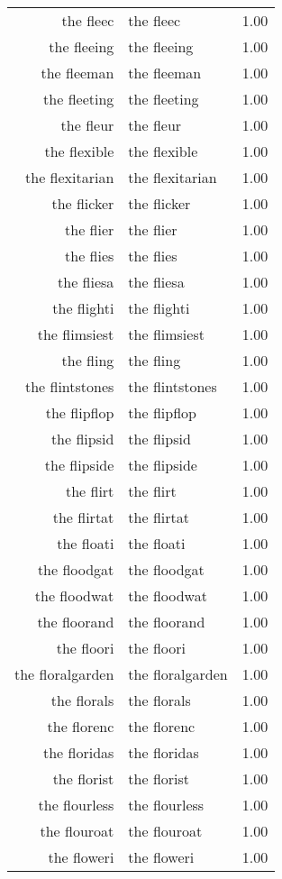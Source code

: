 \begin{table}[ht]
\begin{tabular}{rlr}
  the fleec & the fleec & 1.00 \\ 
  the fleeing & the fleeing & 1.00 \\ 
  the fleeman & the fleeman & 1.00 \\ 
  the fleeting & the fleeting & 1.00 \\ 
  the fleur & the fleur & 1.00 \\ 
  the flexible & the flexible & 1.00 \\ 
  the flexitarian & the flexitarian & 1.00 \\ 
  the flicker & the flicker & 1.00 \\ 
  the flier & the flier & 1.00 \\ 
  the flies & the flies & 1.00 \\ 
  the fliesa & the fliesa & 1.00 \\ 
  the flighti & the flighti & 1.00 \\ 
  the flimsiest & the flimsiest & 1.00 \\ 
  the fling & the fling & 1.00 \\ 
  the flintstones & the flintstones & 1.00 \\ 
  the flipflop & the flipflop & 1.00 \\ 
  the flipsid & the flipsid & 1.00 \\ 
  the flipside & the flipside & 1.00 \\ 
  the flirt & the flirt & 1.00 \\ 
  the flirtat & the flirtat & 1.00 \\ 
  the floati & the floati & 1.00 \\ 
  the floodgat & the floodgat & 1.00 \\ 
  the floodwat & the floodwat & 1.00 \\ 
  the floorand & the floorand & 1.00 \\ 
  the floori & the floori & 1.00 \\ 
  the floralgarden & the floralgarden & 1.00 \\ 
  the florals & the florals & 1.00 \\ 
  the florenc & the florenc & 1.00 \\ 
  the floridas & the floridas & 1.00 \\ 
  the florist & the florist & 1.00 \\ 
  the flourless & the flourless & 1.00 \\ 
  the flouroat & the flouroat & 1.00 \\ 
  the floweri & the floweri & 1.00 \\ 

\end{tabular}
\end{table}
